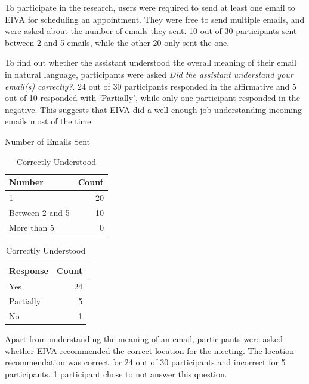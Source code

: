 \documentclass{article}
\begin{document}
To participate in the research, users were required to send at least one email to EIVA for scheduling an appointment. They were free to send multiple emails, and were asked about the number of emails they sent. 10 out of 30 participants sent between 2 and 5 emails, while the other 20 only sent the one.

To find out whether the assistant understood the overall meaning of their email in natural language, participants were asked \emph{Did the assistant understand your email(s) correctly?}. 24 out of 30 participants responded in the affirmative and 5 out of 10 responded with `Partially', while only one participant responded in the negative. This suggests that EIVA did a well-enough job understanding incoming emails most of the time.

\begin{table}[!htb]
	\begin{minipage}{.5\linewidth}
		\caption{Number of Emails Sent}
		\centering
		\begin{tabular}{lr}
			\hline
			\textbf{Number} & \textbf{Count} \\
			\hline
			1               & 20             \\
			Between 2 and 5 & 10             \\
			More than 5     & 0              \\
			\hline
		\end{tabular}
	\end{minipage}%
	\hspace{.1cm}
	\begin{minipage}{.5\linewidth}
		\centering
		\caption{Correctly Understood}
		\begin{tabular}{lr}
			\hline
			\textbf{Response} & \textbf{Count} \\
			\hline
			Yes               & 24             \\
			Partially         & 5              \\
			No                & 1              \\
			\hline
		\end{tabular}
	\end{minipage} 
\end{table}

Apart from understanding the meaning of an email, participants were asked whether EIVA recommended the correct location for the meeting. The location recommendation was correct for 24 out of 30 participants and incorrect for 5 participants. 1 participant chose to not answer this question.
\end{document}
